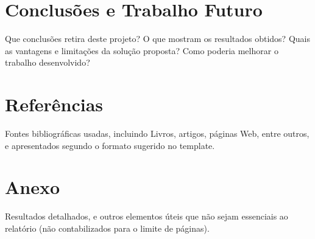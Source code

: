 \documentclass[11pt]{article}
\begin{document}
\section{Conclusões e Trabalho Futuro} Que conclusões retira
deste projeto? O que mostram os resultados obtidos? Quais as vantagens e limitações da
solução proposta? Como poderia melhorar o trabalho desenvolvido?


\section{Referências} Fontes bibliográficas usadas, incluindo Livros, artigos, páginas
Web, entre outros, e apresentados segundo o formato sugerido no template.

\section{Anexo} Resultados detalhados, e outros elementos úteis que não sejam essenciais
ao relatório (não contabilizados para o limite de páginas).
\end{document}
